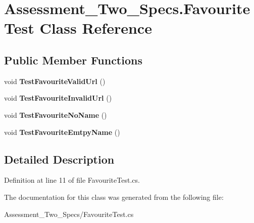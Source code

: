 \hypertarget{class_assessment___two___specs_1_1_favourite_test}{
\section{Assessment\_\-Two\_\-Specs.FavouriteTest Class Reference}
\label{class_assessment___two___specs_1_1_favourite_test}
}
\subsection*{Public Member Functions}
\begin{DoxyCompactItemize}
\item 
\hypertarget{class_assessment___two___specs_1_1_favourite_test_aa4addd8b8902abbff31f36730f274f9c}{
void {\bfseries TestFavouriteValidUrl} ()}
\label{class_assessment___two___specs_1_1_favourite_test_aa4addd8b8902abbff31f36730f274f9c}

\item 
\hypertarget{class_assessment___two___specs_1_1_favourite_test_ad8bb859c52197efd2ebd57dee34b4d39}{
void {\bfseries TestFavouriteInvalidUrl} ()}
\label{class_assessment___two___specs_1_1_favourite_test_ad8bb859c52197efd2ebd57dee34b4d39}

\item 
\hypertarget{class_assessment___two___specs_1_1_favourite_test_acbcf0d00cff1301d772a82ba6de63ef1}{
void {\bfseries TestFavouriteNoName} ()}
\label{class_assessment___two___specs_1_1_favourite_test_acbcf0d00cff1301d772a82ba6de63ef1}

\item 
\hypertarget{class_assessment___two___specs_1_1_favourite_test_a990c3aee1d07fe995d3251b64404b689}{
void {\bfseries TestFavouriteEmtpyName} ()}
\label{class_assessment___two___specs_1_1_favourite_test_a990c3aee1d07fe995d3251b64404b689}

\end{DoxyCompactItemize}


\subsection{Detailed Description}


Definition at line 11 of file FavouriteTest.cs.



The documentation for this class was generated from the following file:\begin{DoxyCompactItemize}
\item 
Assessment\_\-Two\_\-Specs/FavouriteTest.cs\end{DoxyCompactItemize}
